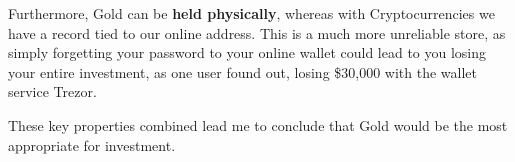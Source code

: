 \documentclass[11pt]{article}
\begin{document}
	Furthermore, Gold can be \textbf{held physically}, whereas with Cryptocurrencies we have a record tied to our online address. This is a much more unreliable store, as simply forgetting your password to your online wallet could lead to you losing your entire investment, as one user found out, losing \$30,000 with the wallet service Trezor. \newline
	
	These key properties combined lead me to conclude that Gold would be the most appropriate for investment.
	\newline \newline \newline
	
%	
%	
%
\end{document}
